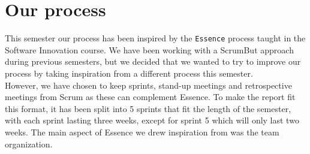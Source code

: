 \section{Our process}\label{sprint1:ourprocess}
This semester our process has been inspired by the \texttt{Essence} process taught in the Software Innovation course.
We have been working with a ScrumBut approach during previous semesters, but we decided that we wanted to try to improve our process by taking inspiration from a different process this semester.\\
However, we have chosen to keep sprints, stand-up meetings and retrospective meetings from Scrum as these can complement Essence.
To make the report fit this format, it has been split into 5 sprints that fit the length of the semester, with each sprint lasting three weeks, except for sprint 5 which will only last two weeks.
The main aspect of Essence we drew inspiration from was the team organization.

